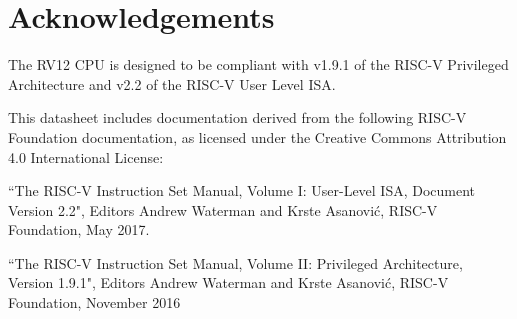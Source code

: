 \chapter{ Acknowledgements}\label{acknowledgements}

The RV12 CPU is designed to be compliant with v1.9.1 of the RISC-V
Privileged Architecture and v2.2 of the RISC-V User Level ISA.

This datasheet includes documentation derived from the following RISC-V
Foundation documentation, as licensed under the Creative Commons
Attribution 4.0 International License:

``The RISC-V Instruction Set Manual, Volume I: User-Level ISA, Document
Version 2.2", Editors Andrew Waterman and Krste Asanović, RISC-V
Foundation, May 2017.

``The RISC-V Instruction Set Manual, Volume II: Privileged Architecture,
Version 1.9.1", Editors Andrew Waterman and Krste Asanović, RISC-V
Foundation, November 2016